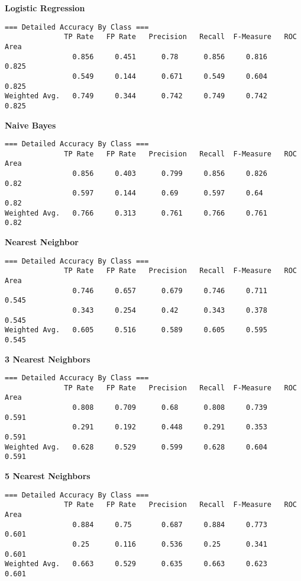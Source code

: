 \documentclass[12pt]{article}
\begin{document}
\begin{enumerate}
\begin{enumerate}
{\bf Logistic Regression}
\begin{verbatim}
=== Detailed Accuracy By Class ===
              TP Rate   FP Rate   Precision   Recall  F-Measure   ROC Area
                0.856     0.451      0.78      0.856     0.816      0.825
                0.549     0.144      0.671     0.549     0.604      0.825
Weighted Avg.   0.749     0.344      0.742     0.749     0.742      0.825
\end{verbatim}
{\bf Naive Bayes}
\begin{verbatim}
=== Detailed Accuracy By Class ===
              TP Rate   FP Rate   Precision   Recall  F-Measure   ROC Area
                0.856     0.403      0.799     0.856     0.826      0.82
                0.597     0.144      0.69      0.597     0.64       0.82
Weighted Avg.   0.766     0.313      0.761     0.766     0.761      0.82 
\end{verbatim}
{\bf Nearest Neighbor}
\begin{verbatim}
=== Detailed Accuracy By Class ===
              TP Rate   FP Rate   Precision   Recall  F-Measure   ROC Area
                0.746     0.657      0.679     0.746     0.711      0.545
                0.343     0.254      0.42      0.343     0.378      0.545
Weighted Avg.   0.605     0.516      0.589     0.605     0.595      0.545
\end{verbatim}
{\bf 3 Nearest Neighbors}
\begin{verbatim}
=== Detailed Accuracy By Class ===
              TP Rate   FP Rate   Precision   Recall  F-Measure   ROC Area
                0.808     0.709      0.68      0.808     0.739      0.591
                0.291     0.192      0.448     0.291     0.353      0.591
Weighted Avg.   0.628     0.529      0.599     0.628     0.604      0.591
\end{verbatim}
{\bf 5 Nearest Neighbors}
\begin{verbatim}
=== Detailed Accuracy By Class ===
              TP Rate   FP Rate   Precision   Recall  F-Measure   ROC Area
                0.884     0.75       0.687     0.884     0.773      0.601
                0.25      0.116      0.536     0.25      0.341      0.601
Weighted Avg.   0.663     0.529      0.635     0.663     0.623      0.601
\end{verbatim}

\end{enumerate}
\end{enumerate}
\end{document}
